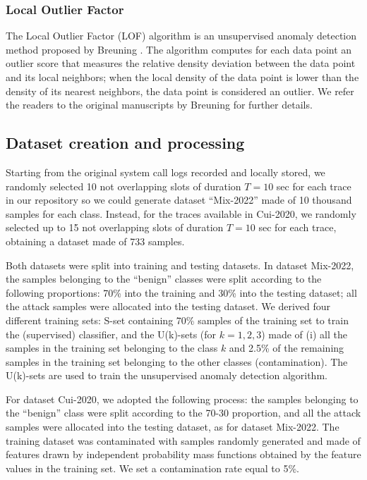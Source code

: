\subsubsection{Local Outlier Factor}

The Local Outlier Factor (LOF) algorithm is an unsupervised anomaly detection method proposed by Breuning \etal \cite{breunig2000lof}. The algorithm computes for each data point an outlier score that measures the relative density deviation between the data point and its local neighbors; when the local density of the data point is lower than the density of its nearest neighbors, the data point is considered an outlier. 
We refer the readers to the original manuscripts by Breuning \etal \cite{breunig2000lof} for further details.

\subsection{Dataset creation and processing}
Starting from the original system call logs recorded and locally  stored, we randomly selected 10 not overlapping slots of duration $T=10$ sec for each trace in our repository so we could generate dataset ``Mix-2022'' made of 10 thousand samples for each class. Instead, for the traces available in Cui-2020, we randomly selected up to 15 not overlapping  slots of duration $T=10$ sec for each trace, obtaining a dataset made of 733 samples. 

Both datasets were split into training and testing datasets. In dataset Mix-2022, the samples belonging to the ``benign'' classes were split according to the following proportions: 70\% into the training and 30\% into the testing dataset; all the attack samples were allocated into the testing dataset. We derived four different training sets: S-set containing 70\% samples of the training set to train the (supervised) classifier, and the U(k)-sets (for $k=1,2,3$)  made of (i) all the samples in the training set belonging to the class $k$ and 2.5\% of the remaining samples in the training set belonging to the other classes (contamination). The U(k)-sets are used to train the unsupervised anomaly detection algorithm.

For dataset Cui-2020, we adopted the following process: the samples belonging to the ``benign'' class were split according to the 70-30 proportion, and all the attack samples were allocated into the testing dataset, as for dataset Mix-2022. The training dataset was contaminated with samples randomly generated and made of features drawn by independent probability mass functions obtained by the feature values in the training set. We set a contamination rate equal to 5\%.


